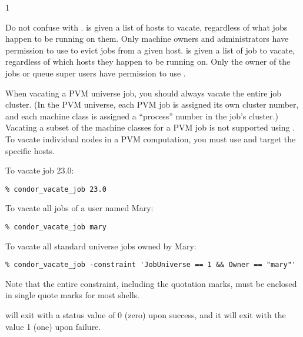 \begin{ManPage}{\label{man-condor-vacate-job}}{1}
\GenRem

Do not confuse  with .
 is given a list of hosts to vacate, regardless of what
jobs happen to be running on them.
Only machine owners and administrators have permission to use
 to evict jobs from a given host.
 is given a list of job to vacate, regardless of
which hosts they happen to be running on.
Only the owner of the jobs or queue super users have permission to use
.

When vacating a PVM universe job, you should always vacate the entire
job cluster.  (In the PVM universe, each PVM job is assigned its own
cluster number, and each machine class is assigned a ``process''
number in the job's cluster.)  Vacating a subset of the machine
classes for a PVM job is not supported using .
To vacate individual nodes in a PVM computation, you must use
 and target the specific hosts.  

\Examples

To vacate job 23.0:
\begin{verbatim}
% condor_vacate_job 23.0
\end{verbatim}

To vacate all jobs of a user named Mary:
\begin{verbatim}
% condor_vacate_job mary 
\end{verbatim}

To vacate all standard universe jobs owned by Mary:
\footnotesize
\begin{verbatim}
% condor_vacate_job -constraint 'JobUniverse == 1 && Owner == "mary"'
\end{verbatim}
\normalsize
Note that the entire constraint, including the quotation marks, must
be enclosed in single quote marks for most shells.

\ExitStatus

 will exit with a status value of 0 (zero) upon success,
and it will exit with the value 1 (one) upon failure.

\end{ManPage}

